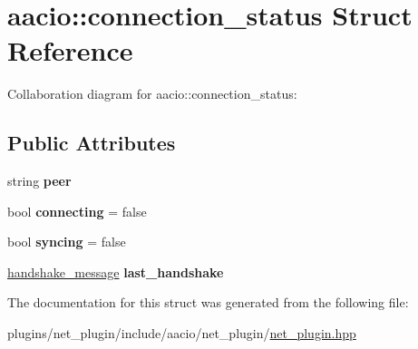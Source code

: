 \hypertarget{structaacio_1_1connection__status}{}\section{aacio\+:\+:connection\+\_\+status Struct Reference}
\label{structaacio_1_1connection__status}


Collaboration diagram for aacio\+:\+:connection\+\_\+status\+:
\subsection*{Public Attributes}
\begin{DoxyCompactItemize}
\item 
\mbox{\label{structaacio_1_1connection__status_af6d6f62e255c6af2259752d928b49f4f}} 
string {\bfseries peer}
\item 
\mbox{\label{structaacio_1_1connection__status_a92696638fbe97ed0843ae70b9e7318f1}} 
bool {\bfseries connecting} = false
\item 
\mbox{\label{structaacio_1_1connection__status_a834528187dd5a25833f162dd6fde2fbc}} 
bool {\bfseries syncing} = false
\item 
\mbox{\label{structaacio_1_1connection__status_a925101ed1065e85e84c5ea00cac45d84}} 
\mbox{\hyperlink{structaacio_1_1handshake__message}{handshake\+\_\+message}} {\bfseries last\+\_\+handshake}
\end{DoxyCompactItemize}


The documentation for this struct was generated from the following file\+:\begin{DoxyCompactItemize}
\item 
plugins/net\+\_\+plugin/include/aacio/net\+\_\+plugin/\mbox{\hyperlink{net__plugin_8hpp}{net\+\_\+plugin.\+hpp}}\end{DoxyCompactItemize}
